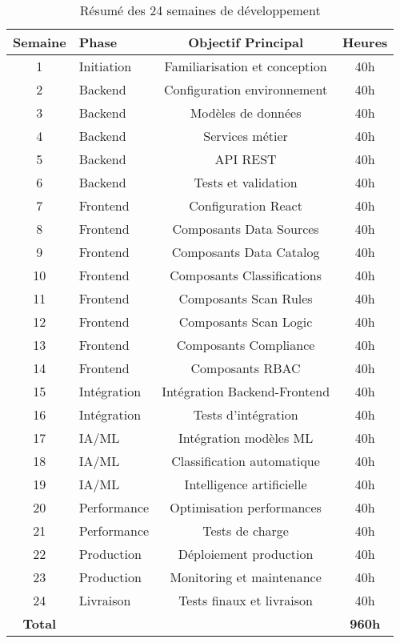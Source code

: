 \begin{table}[H]
\centering
\begin{tabular}{|c|l|c|c|}
\hline
\textbf{Semaine} & \textbf{Phase} & \textbf{Objectif Principal} & \textbf{Heures} \\
\hline
1 & Initiation & Familiarisation et conception & 40h \\
2 & Backend & Configuration environnement & 40h \\
3 & Backend & Modèles de données & 40h \\
4 & Backend & Services métier & 40h \\
5 & Backend & API REST & 40h \\
6 & Backend & Tests et validation & 40h \\
7 & Frontend & Configuration React & 40h \\
8 & Frontend & Composants Data Sources & 40h \\
9 & Frontend & Composants Data Catalog & 40h \\
10 & Frontend & Composants Classifications & 40h \\
11 & Frontend & Composants Scan Rules & 40h \\
12 & Frontend & Composants Scan Logic & 40h \\
13 & Frontend & Composants Compliance & 40h \\
14 & Frontend & Composants RBAC & 40h \\
15 & Intégration & Intégration Backend-Frontend & 40h \\
16 & Intégration & Tests d'intégration & 40h \\
17 & IA/ML & Intégration modèles ML & 40h \\
18 & IA/ML & Classification automatique & 40h \\
19 & IA/ML & Intelligence artificielle & 40h \\
20 & Performance & Optimisation performances & 40h \\
21 & Performance & Tests de charge & 40h \\
22 & Production & Déploiement production & 40h \\
23 & Production & Monitoring et maintenance & 40h \\
24 & Livraison & Tests finaux et livraison & 40h \\
\hline
\textbf{Total} & & & \textbf{960h} \\
\hline
\end{tabular}
\caption{Résumé des 24 semaines de développement}
\end{table}
